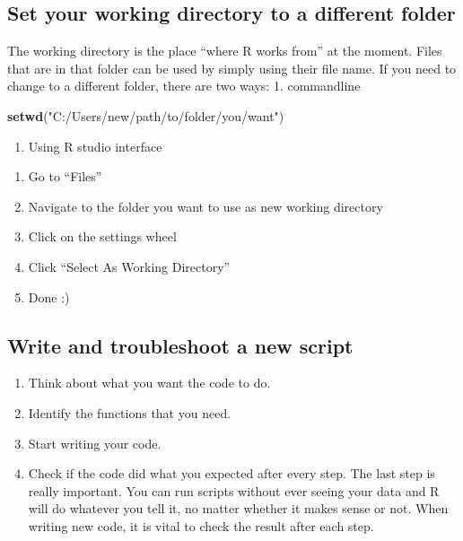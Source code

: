 \documentclass[
]{book}
\newenvironment{Shaded}{\begin{snugshade}}{\end{snugshade}}
\newcommand{\FunctionTok}[1]{\textcolor[rgb]{0.13,0.29,0.53}{\textbf{#1}}}
\newcommand{\NormalTok}[1]{#1}
\newcommand{\StringTok}[1]{\textcolor[rgb]{0.31,0.60,0.02}{#1}}
\providecommand{\tightlist}{%
  \setlength{\itemsep}{0pt}\setlength{\parskip}{0pt}}
\begin{document}
\subsection{Set your working directory to a different folder}\label{setwd}

The working directory is the place ``where R works from'' at the moment. Files that are in that folder can be used by simply using their file name. If you need to change to a different folder, there are two ways:
1. commandline

\begin{Shaded}
\begin{Highlighting}[]
\FunctionTok{setwd}\NormalTok{(}\StringTok{"C:/Users/new/path/to/folder/you/want"}\NormalTok{)}
\end{Highlighting}
\end{Shaded}

\begin{enumerate}
\def\labelenumi{\arabic{enumi}.}
\setcounter{enumi}{1}
\tightlist
\item
  Using R studio interface
\end{enumerate}

\begin{enumerate}
\def\labelenumi{\alph{enumi})}
\tightlist
\item
  Go to ``Files''
\item
  Navigate to the folder you want to use as new working directory
\item
  Click on the settings wheel
\item
  Click ``Select As Working Directory''
\item
  Done :)
\end{enumerate}

\subsection{Write and troubleshoot a new script}\label{write-and-troubleshoot-a-new-script}

\begin{enumerate}
\def\labelenumi{\arabic{enumi}.}
\tightlist
\item
  Think about what you want the code to do.
\item
  Identify the functions that you need.
\item
  Start writing your code.
\item
  Check if the code did what you expected after every step.
  The last step is really important. You can run scripts without ever seeing your data and R will do whatever you tell it, no matter whether it makes sense or not. When writing new code, it is vital to check the result after each step.
\end{enumerate}
\end{document}
